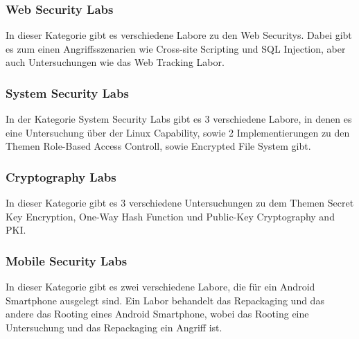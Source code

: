 \subsubsection{Web Security Labs}
In dieser Kategorie gibt es verschiedene Labore zu den Web Securitys. Dabei gibt es zum einen Angriffsszenarien wie Cross-site Scripting und SQL Injection, aber auch Untersuchungen wie das Web Tracking Labor.
\subsubsection{System Security Labs}
In der Kategorie System Security Labs gibt es 3 verschiedene Labore, in denen es eine Untersuchung über der Linux Capability, sowie 2 Implementierungen zu den Themen Role-Based Access Controll, sowie Encrypted File System gibt.
\subsubsection{Cryptography Labs}
In dieser Kategorie gibt es 3 verschiedene Untersuchungen zu dem Themen Secret Key Encryption, One-Way Hash Function und Public-Key Cryptography and PKI.
\subsubsection{Mobile Security Labs}
In dieser Kategorie gibt es zwei verschiedene Labore, die für ein Android Smartphone ausgelegt sind. Ein Labor behandelt das Repackaging und das andere das Rooting eines Android Smartphone, wobei das Rooting eine Untersuchung und das Repackaging ein Angriff ist.
